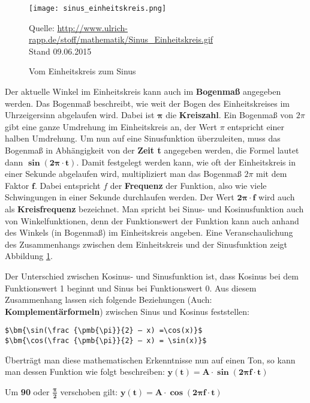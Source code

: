 \begin{figure} [ht]
\centering
\texttt{[image: sinus\_einheitskreis.png]}
\caption{Vom Einheitskreis zum Sinus}
\label{fig:unitcircleToSinus}
Quelle: \url{http://www.ulrich-rapp.de/stoff/mathematik/Sinus_Einheitskreis.gif}
\\Stand 09.06.2015
\end{figure}

Der aktuelle Winkel im Einheitskreis kann auch im \textbf{Bogenmaß} angegeben werden. Das Bogenmaß beschreibt, wie weit der Bogen des Einheitskreises im Uhrzeigersinn abgelaufen wird. Dabei ist $\bm{\pmb{\pi}}$ die \textbf{Kreiszahl}. Ein Bogenmaß von $2\pi$ gibt eine ganze Umdrehung im Einheitskreis an, der Wert $\pi$ entspricht einer halben Umdrehung. Um nun auf eine Sinusfunktion überzuleiten, muss das Bogenmaß in Abhängigkeit von der \textbf{Zeit t} angegeben werden, die Formel lautet dann $\bm{\sin(2\pmb{\pi}\cdot t)}$. Damit festgelegt werden kann, wie oft der Einheitskreis in einer Sekunde abgelaufen wird, multipliziert man das Bogenmaß $2\pi$ mit dem Faktor $\bm{f}$. Dabei entspricht $f$ der \textbf{Frequenz} der Funktion, also wie viele Schwingungen in einer Sekunde durchlaufen werden. Der Wert $\bm{2\pmb{\pi} \cdot f}$ wird auch als \textbf{Kreisfrequenz} bezeichnet.
Man spricht bei Sinus- und Kosinusfunktion auch von Winkelfunktionen, denn der Funktionswert der Funktion kann auch anhand des Winkels (in Bogenmaß) im Einheitskreis angeben. 
Eine Veranschaulichung des Zusammenhangs zwischen dem Einheitskreis und der Sinusfunktion zeigt Abbildung \ref{fig:unitcircleToSinus}.

Der Unterschied zwischen Kosinus- und Sinusfunktion ist, dass Kosinus bei dem Funktionswert 1 beginnt und Sinus bei Funktionswert 0. Aus diesem Zusammenhang lassen sich folgende Beziehungen (Auch: \textbf{Komplementärformeln}) zwischen Sinus und Kosinus feststellen:\\

\begin{lstlisting}[mathescape]
$\bm{\sin(\frac {\pmb{\pi}}{2} – x) =\cos(x)}$
$\bm{\cos(\frac {\pmb{\pi}}{2} – x) = \sin(x)}$ 
\end{lstlisting}\cite[s. 218]{matheBuch}

Überträgt man diese mathematischen Erkenntnisse nun auf einen Ton, so kann man dessen Funktion wie folgt beschreiben: 		$\bm{y(t) = A \cdot \sin(2 \pmb{\pi} f \cdot t)}$

Um \textbf{90\degree} oder $\bm{\frac{\pmb{\pi}}{2}}$ verschoben gilt: 		$\bm{y(t) = A\cdot \cos(2 \pmb{\pi} f\cdot t)}$

